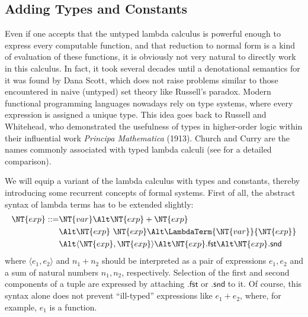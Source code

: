 
\subsection{Adding Types and Constants}
\label{sec:adding-types}

Even if one accepts that the untyped lambda calculus is powerful enough to
express every computable function, and that reduction to normal form is a kind
of evaluation of these functions, it is obviously not very natural to directly
work in this calculus. In fact, it took several decades until a denotational
semantics for it was found by Dana Scott, which does not raise problems similar
to those encountered in naive (untyped) set theory like Russell's paradox.
Modern functional programming languages nowadays rely on type systems, where
every expression is assigned a unique type. This idea goes back to Russell and
Whitehead, who demonstrated the usefulness of types in higher-order logic within
their influential work \emph{Principa Mathematica} (1913). Church and Curry are
the names commonly associated with typed lambda calculi (see \cite{Barendregt92}
for a detailed comparison).

We will equip a variant of the lambda calculus with types and constants,
thereby introducing some recurrent concepts of formal systems. First of all, the
abstract syntax of lambda terms has to be extended slightly:
\begin{equation}
  \label{eq:type-lambda-syn}
  \begin{split}
    \NT{exp} ::= &\NT{var}     \Alt \NT{exp} + \NT{exp} \\
    & \Alt \NT{exp}\ \NT{exp} \Alt
    \LambdaTerm{\NT{var}}{\NT{exp}} \\
    & \Alt \langle\NT{exp}, \NT{exp}\rangle \Alt \NT{exp}.\mathsf{fst}
    \Alt \NT{exp}.\mathsf{snd}
  \end{split}
\end{equation}
where  $\langle e_1, e_2\rangle$ and $n_1 + n_2$ should be interpreted as a pair of
expressions $e_1, e_2$ and a sum of natural numbers $n_1, n_2$, respectively.
Selection of the first and second components of a tuple are expressed by
attaching $.\mathsf{fst}$ or $.\mathsf{snd}$ to it.  Of course, this syntax
alone does not prevent ``ill-typed'' expressions like $e_1 + e_2$, where, for
example,  $e_1$ is a function.

